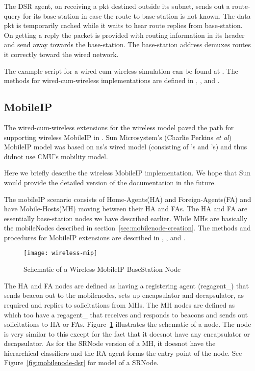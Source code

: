 The DSR agent, on receiving a pkt destined outside its subnet, sends
out a route-query for its base-station in case the route to
base-station is not known. The data pkt is temporarily cached while it
waits to hear route replies from base-station. On getting a reply the
packet is provided with routing information in its header and send
away towards the base-station. The base-station address demuxes routes
it correctly toward the wired network.

The example script for a wired-cum-wireless simulation can be found at
. The methods for
wired-cum-wireless implementations are defined in
, ,  and
.


\subsection{MobileIP}
\label{sec:mobileip}

The wired-cum-wireless extensions for the wireless model paved the
path for supporting wireless MobileIP in \ns. Sun Microsystem's
(Charlie Perkins {\em et al}) MobileIP model was based on ns's wired model
(consisting of 's and 's) and thus didnot use
CMU's mobility model.

Here we briefly describe the wireless MobileIP implementation. We hope
that Sun would provide the detailed version of the documentation in
the future.

The mobileIP scenario consists of Home-Agents(HA) and
Foreign-Agents(FA) and have Mobile-Hosts(MH) moving between their HA
and FAs.
The HA and FA are essentially base-station nodes we have described
earlier. While MHs are basically the mobileNodes described in
section~\ref{sec:mobilenode-creation}.
The methods and procedures for MobileIP extensions are described in
, ,  and
.

\begin{figure}
    \centerline{\texttt{[image: wireless-mip]}}
    \caption{Schematic of a Wireless MobileIP BaseStation Node}
    \label{fig:mobilenode-wireless-mip}
\end{figure}
The HA and FA nodes are defined as  having a
registering agent (regagent\_) that sends beacon out to the
mobilenodes, sets up encapsulator and decapsulator, as required and
replies to solicitations from MHs. 
The MH nodes are defined as  which too have a
regagent\_ that receives and responds to beacons and sends out
solicitations to HA or FAs. Figure~\ref{fig:mobilenode-wireless-mip}
illustrates the schematic of a  
node. The  node is very similar to this except
for the fact that it doesnot have any encapsulator or decapsulator. As
for the SRNode version of a MH, it doesnot have the hierarchical
classifiers and the RA agent forms the entry point of the node. See
Figure~\ref{fig:mobilenode-dsr} for model of a SRNode. 

